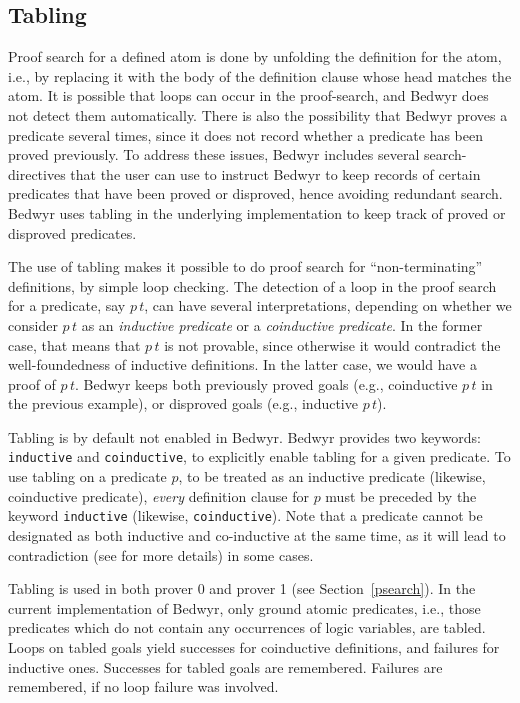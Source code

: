 \documentclass{article}
\begin{document}
\subsection{Tabling}

Proof search for a defined atom is done by unfolding the definition 
for the atom, i.e., by replacing it with the body of the definition clause 
whose head matches the atom. It is possible that loops can occur in 
the proof-search, and Bedwyr does not detect them automatically. 
There is also the possibility that Bedwyr proves a predicate several
times, since it does not record whether a predicate has been proved
previously.
To address these issues, Bedwyr includes several search-directives
that the user can use to instruct Bedwyr to keep records of certain
predicates that have been proved or disproved, hence avoiding redundant search.
Bedwyr uses tabling in the underlying implementation to keep track
of proved or disproved predicates.

The use of tabling makes it possible to do proof search for
``non-terminating'' definitions, by simple loop checking.
The detection of a loop in the proof search for a predicate, say
$p\,t$, can have several interpretations, depending on whether
we consider $p\,t$ as an {\em inductive predicate} or
a {\em coinductive predicate}. In the former case, that means that
$p\,t$ is not provable, since otherwise it would contradict
the well-foundedness of inductive definitions. In the latter case,
we would have a proof of $p\,t$. Bedwyr keeps both previously proved goals 
(e.g., coinductive $p\,t$ in the previous example), 
or disproved goals (e.g., inductive $p\,t$). 

Tabling is by default not enabled in Bedwyr. Bedwyr provides two
keywords: \texttt{inductive} and \texttt{coinductive}, to explicitly
enable tabling for a given predicate. 
To use tabling on a predicate $p$, to be treated as an inductive predicate
(likewise, coinductive predicate), {\em every} definition clause for $p$
must be preceded by the keyword \texttt{inductive} 
(likewise, \texttt{coinductive}).
Note that a predicate cannot be designated as both inductive and co-inductive
at the same time, as it will lead to contradiction (see 
\cite{momigliano03types} for more details) in some cases. 

Tabling is used in both prover 0 and prover 1 (see Section~\ref{psearch}).
In the current implementation of Bedwyr, only ground atomic predicates, i.e.,
those predicates which do not contain any occurrences of logic variables, 
are tabled. 
Loops on tabled goals yield successes for coinductive definitions,
and failures for inductive ones.
Successes for tabled goals are remembered.
Failures are remembered, if no loop failure was involved.
\end{document}

